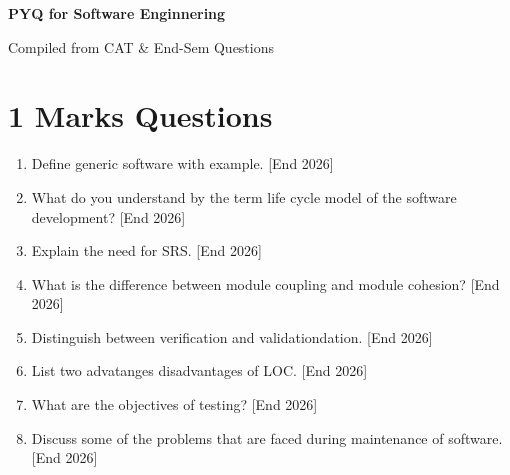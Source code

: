 \documentclass[12pt,a4paper]{article}
\begin{document}
\begin{center}
    \Large \textbf{PYQ for Software Enginnering}
    

    Compiled from CAT \& End-Sem Questions
\end{center}

\section{1 Marks Questions}
\begin{enumerate}
    \item Define generic software with example. \hfill [End 2026]
    \item What do you understand by the term life cycle model of the software development? \hfill [End 2026]
    \item Explain the need for SRS. \hfill [End 2026]
    \item What is the difference between module coupling and module cohesion? \hfill [End 2026]
    \item Distinguish between verification and validationdation. \hfill [End 2026]
    \item List two advatanges disadvantages of LOC. \hfill [End 2026]
    \item What are the objectives of testing? \hfill [End 2026]
    \item Discuss some of the problems that are faced during maintenance of software. \hfill [End 2026]
\end{enumerate}
\end{document}
